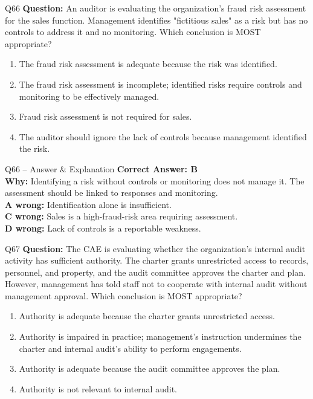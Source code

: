 \documentclass[aspectratio=169,10pt]{beamer}
\begin{document}
	\begin{frame}[t]{Q66}
		\small
		\textbf{Question:} An auditor is evaluating the organization's fraud risk assessment for the sales function. Management identifies "fictitious sales" as a risk but has no controls to address it and no monitoring. Which conclusion is MOST appropriate?
		\begin{enumerate}[label=\Alph*.,itemsep=1pt,topsep=2pt]
			\item The fraud risk assessment is adequate because the risk was identified.
			\item The fraud risk assessment is incomplete; identified risks require controls and monitoring to be effectively managed.
			\item Fraud risk assessment is not required for sales.
			\item The auditor should ignore the lack of controls because management identified the risk.
		\end{enumerate}
	\end{frame}
	
	\begin{frame}[t]{Q66 -- Answer \& Explanation}
		\small
		\textbf{Correct Answer: B} \\[4pt]
		\textbf{Why:} Identifying a risk without controls or monitoring does not manage it. The assessment should be linked to responses and monitoring. \\[4pt]
		\textbf{A wrong:} Identification alone is insufficient. \\[2pt]
		\textbf{C wrong:} Sales is a high-fraud-risk area requiring assessment. \\[2pt]
		\textbf{D wrong:} Lack of controls is a reportable weakness.
	\end{frame}
	
	\begin{frame}[t]{Q67}
		\small
		\textbf{Question:} The CAE is evaluating whether the organization's internal audit activity has sufficient authority. The charter grants unrestricted access to records, personnel, and property, and the audit committee approves the charter and plan. However, management has told staff not to cooperate with internal audit without management approval. Which conclusion is MOST appropriate?
		\begin{enumerate}[label=\Alph*.,itemsep=1pt,topsep=2pt]
			\item Authority is adequate because the charter grants unrestricted access.
			\item Authority is impaired in practice; management's instruction undermines the charter and internal audit's ability to perform engagements.
			\item Authority is adequate because the audit committee approves the plan.
			\item Authority is not relevant to internal audit.
		\end{enumerate}
	\end{frame}
	
\end{document}
